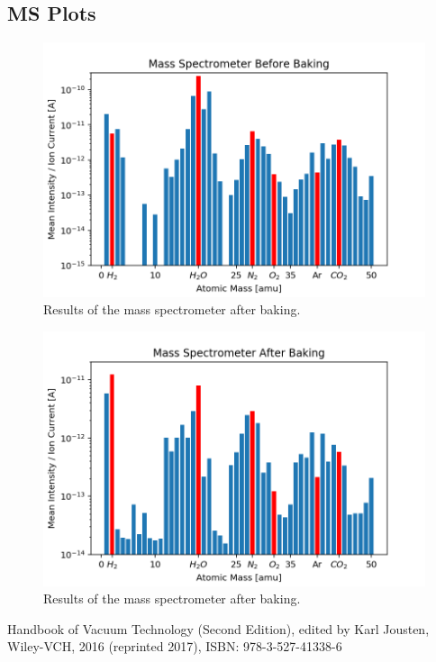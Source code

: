 \documentclass[]{article}
\begin{document}
\subsection{MS Plots}
\label{MS Plots}

\begin{figure}[!h]
\centering\includegraphics[width=.5\textwidth]{Plots/MSbefore.png}
\caption{Results of the mass spectrometer after baking.}
\label{fig::MSbefore}
\end{figure}

\begin{figure}[!h]
\centering\includegraphics[width=.5\textwidth]{Plots/MSafter.png}
\caption{Results of the mass spectrometer after baking.}
\label{fig::MSafter}
\end{figure}

\newpage
\begin{thebibliography}{9}

 Handbook of Vacuum Technology (Second Edition), edited by Karl Jousten, Wiley-VCH, 2016 (reprinted 2017), ISBN: 978-3-527-41338-6

\end{thebibliography}
\end{document}
